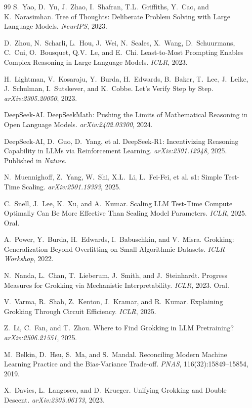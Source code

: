 \documentclass[11pt, a4paper]{article}
\theoremstyle{definition}
\theoremstyle{plain}
\begin{document}
\begin{thebibliography}{99}
S.~Yao, D.~Yu, J.~Zhao, I.~Shafran, T.L.~Griffiths, Y.~Cao, and
K.~Narasimhan.
\newblock Tree of Thoughts: Deliberate Problem Solving with Large Language
Models.
\newblock \emph{NeurIPS}, 2023.

D.~Zhou, N.~Scharli, L.~Hou, J.~Wei, N.~Scales, X.~Wang, D.~Schuurmans,
C.~Cui, O.~Bousquet, Q.V.~Le, and E.~Chi.
\newblock Least-to-Most Prompting Enables Complex Reasoning in Large Language
Models.
\newblock \emph{ICLR}, 2023.

H.~Lightman, V.~Kosaraju, Y.~Burda, H.~Edwards, B.~Baker, T.~Lee,
J.~Leike, J.~Schulman, I.~Sutskever, and K.~Cobbe.
\newblock Let's Verify Step by Step.
\newblock \emph{arXiv:2305.20050}, 2023.

DeepSeek-AI.
\newblock DeepSeekMath: Pushing the Limits of Mathematical Reasoning in Open
Language Models.
\newblock \emph{arXiv:2402.03300}, 2024.

DeepSeek-AI, D.~Guo, D.~Yang, et al.
\newblock DeepSeek-R1: Incentivizing Reasoning Capability in LLMs via
Reinforcement Learning.
\newblock \emph{arXiv:2501.12948}, 2025. Published in \emph{Nature}.

N.~Muennighoff, Z.~Yang, W.~Shi, X.L.~Li, L.~Fei-Fei, et al.
\newblock s1: Simple Test-Time Scaling.
\newblock \emph{arXiv:2501.19393}, 2025.

C.~Snell, J.~Lee, K.~Xu, and A.~Kumar.
\newblock Scaling LLM Test-Time Compute Optimally Can Be More Effective Than
Scaling Model Parameters.
\newblock \emph{ICLR}, 2025. Oral.

A.~Power, Y.~Burda, H.~Edwards, I.~Babuschkin, and V.~Misra.
\newblock Grokking: Generalization Beyond Overfitting on Small Algorithmic
Datasets.
\newblock \emph{ICLR Workshop}, 2022.

N.~Nanda, L.~Chan, T.~Lieberum, J.~Smith, and J.~Steinhardt.
\newblock Progress Measures for Grokking via Mechanistic Interpretability.
\newblock \emph{ICLR}, 2023. Oral.

V.~Varma, R.~Shah, Z.~Kenton, J.~Kramar, and R.~Kumar.
\newblock Explaining Grokking Through Circuit Efficiency.
\newblock \emph{ICLR}, 2025.

Z.~Li, C.~Fan, and T.~Zhou.
\newblock Where to Find Grokking in LLM Pretraining?
\newblock \emph{arXiv:2506.21551}, 2025.

M.~Belkin, D.~Hsu, S.~Ma, and S.~Mandal.
\newblock Reconciling Modern Machine Learning Practice and the Bias-Variance
Trade-off.
\newblock \emph{PNAS}, 116(32):15849--15854, 2019.

X.~Davies, L.~Langosco, and D.~Krueger.
\newblock Unifying Grokking and Double Descent.
\newblock \emph{arXiv:2303.06173}, 2023.

\end{thebibliography}
\end{document}
